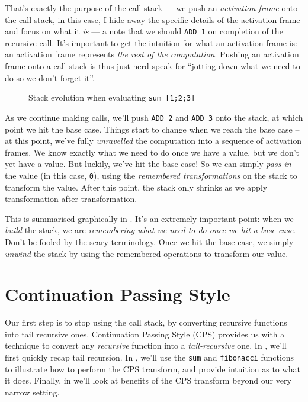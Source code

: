 That's exactly the purpose of the call stack --- we push an \emph{activation frame} onto the call stack, in this case, I hide away the specific details of the activation frame and focus on what it \emph{is} --- a note that we should \texttt{ADD 1} on completion of the recursive call. It's important to get the intuition for what an activation frame is: an activation frame represents \emph{the rest of the computation}. Pushing an activation frame onto a call stack is thus just nerd-speak for ``jotting down what we need to do so we don't forget it''. 

\begin{figure}[h]
    \centering
    
    \vspace{-10mm}
    \caption{Stack evolution when evaluating 
    \texttt{sum [1;2;3]}}
    \label{fig-sumstack}
\end{figure}

As we continue making calls, we'll push \texttt{ADD 2} and \texttt{ADD 3} onto the stack, at which point we hit the base case. Things start to change when we reach the base case -- at this point, we've fully \emph{unravelled} the computation into a sequence of activation frames. We know exactly what we need to do once we have a value, but we don't yet have a value. But luckily, we've hit the base case! So we can simply \emph{pass in} the value (in this case, \texttt{0}), using the \emph{remembered transformations} on the stack to transform the value. After this point, the stack only shrinks as we apply transformation after transformation.

This is summarised graphically in . It's an extremely important point: when we \emph{build} the stack, we are \emph{remembering what we need to do once we hit a base case}. Don't be fooled by the scary terminology. Once we hit the base case, we simply \emph{unwind} the stack by using the remembered operations to transform our value.

\section{Continuation Passing Style}\label{section:cps-transform}
Our first step is to stop using the call stack, by converting recursive functions into tail recursive ones. Continuation Passing Style (CPS) provides us with a technique to convert any \emph{recursive} function into a \emph{tail-recursive} one. In , we'll first quickly recap tail recursion. In , we'll use the \texttt{sum} and \texttt{fibonacci} functions to illustrate how to perform the CPS transform, and provide intuition as to what it does. Finally, in  we'll look at benefits of the CPS transform beyond our very narrow setting.

